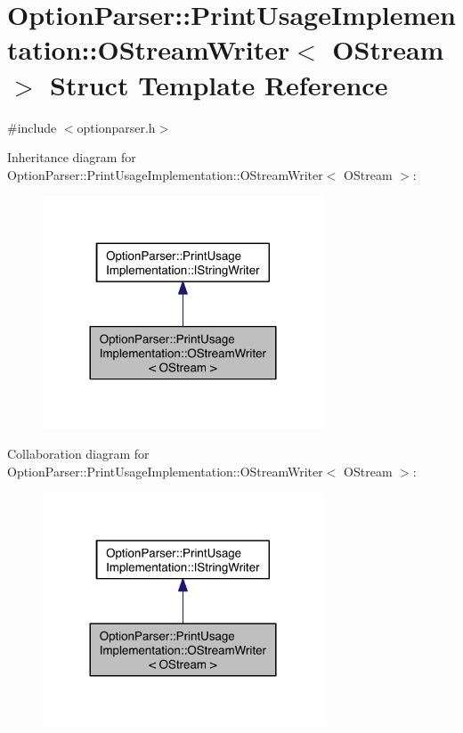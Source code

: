 \hypertarget{struct_option_parser_1_1_print_usage_implementation_1_1_o_stream_writer}{\section{Option\-Parser\-:\-:Print\-Usage\-Implementation\-:\-:O\-Stream\-Writer$<$ O\-Stream $>$ Struct Template Reference}
\label{struct_option_parser_1_1_print_usage_implementation_1_1_o_stream_writer}
}


{\ttfamily \#include $<$optionparser.\-h$>$}



Inheritance diagram for Option\-Parser\-:\-:Print\-Usage\-Implementation\-:\-:O\-Stream\-Writer$<$ O\-Stream $>$\-:\nopagebreak
\begin{figure}[H]
\begin{center}
\leavevmode
\includegraphics[width=236pt]{struct_option_parser_1_1_print_usage_implementation_1_1_o_stream_writer__inherit__graph}
\end{center}
\end{figure}


Collaboration diagram for Option\-Parser\-:\-:Print\-Usage\-Implementation\-:\-:O\-Stream\-Writer$<$ O\-Stream $>$\-:\nopagebreak
\begin{figure}[H]
\begin{center}
\leavevmode
\includegraphics[width=236pt]{struct_option_parser_1_1_print_usage_implementation_1_1_o_stream_writer__coll__graph}
\end{center}
\end{figure}
